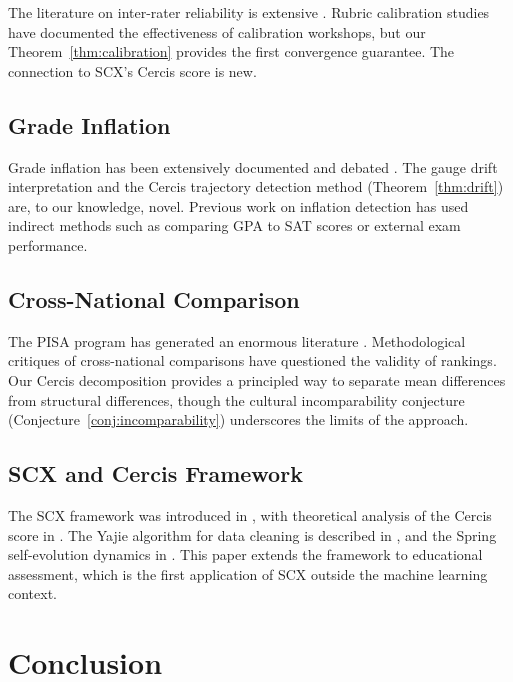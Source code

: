 \documentclass[12pt,a4paper]{article}
\theoremstyle{remark}
\begin{document}
The literature on inter-rater reliability is extensive \cite{cohen1960, fleiss1971, krippendorff2004, landis1977}. Rubric calibration studies \cite{jonsson2007, panadero2014} have documented the effectiveness of calibration workshops, but our Theorem~\ref{thm:calibration} provides the first convergence guarantee. The connection to SCX's Cercis score is new.

\subsection{Grade Inflation}

Grade inflation has been extensively documented \cite{rumberger2008, roistaczer2012, jewell2013} and debated \cite{alexander2003}. The gauge drift interpretation and the Cercis trajectory detection method (Theorem~\ref{thm:drift}) are, to our knowledge, novel. Previous work on inflation detection has used indirect methods such as comparing GPA to SAT scores \cite{bound1995} or external exam performance.

\subsection{Cross-National Comparison}

The PISA program has generated an enormous literature \cite{oecd2019, hanushek2012, dronkers2008}. Methodological critiques of cross-national comparisons \cite{goldstein2004, rutkowski2010} have questioned the validity of rankings. Our Cercis decomposition provides a principled way to separate mean differences from structural differences, though the cultural incomparability conjecture (Conjecture~\ref{conj:incomparability}) underscores the limits of the approach.

\subsection{SCX and Cercis Framework}

The SCX framework was introduced in \cite{scx2026}, with theoretical analysis of the Cercis score in \cite{cercisbound2026}. The Yajie algorithm for data cleaning is described in \cite{yajie2026}, and the Spring self-evolution dynamics in \cite{spring2026}. This paper extends the framework to educational assessment, which is the first application of SCX outside the machine learning context.

\section{Conclusion}
\end{document}

